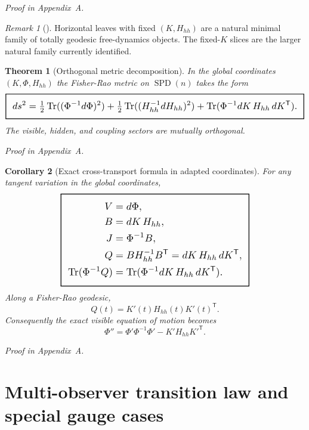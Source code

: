 \documentclass[11pt,a4paper]{article}
\numberwithin{equation}{section}
\DeclareMathOperator{\Tr}{Tr}
\DeclareMathOperator{\SPD}{SPD}
\newcommand{\geomboxed}[1]{%
  \setlength{\fboxsep}{8pt}%
  \setlength{\fboxrule}{0.9pt}%
  \fbox{\scalebox{1.22}{$\displaystyle #1$}}%
}
\theoremstyle{thmcompact}
\newtheorem{theorem}{Theorem}[section]
\newtheorem{corollary}[theorem]{Corollary}
\theoremstyle{remark}
\newtheorem*{remarkplain}{Remark}
\newenvironment{remark}[1][]%
{\begin{remarkbox}\begin{remarkplain}[#1]\normalfont}
{\end{remarkplain}\end{remarkbox}}
\newcommand{\proofappendix}{\par{\hfill\scriptsize\emph{Proof in Appendix~A.}}\par}
\begin{document}
\proofappendix

\begin{remark}
Horizontal leaves with fixed $(K,H_{hh})$ are a natural minimal family of totally geodesic free-dynamics objects. The fixed-$K$ slices are the larger natural family currently identified.
\end{remark}

\begin{theorem}[Orthogonal metric decomposition]
\label{thm:metric-decomposition}
In the global coordinates $(K,\Phi,H_{hh})$ the Fisher-Rao metric on $\SPD(n)$ takes the form
\begin{equation}
\geomboxed{ds^2=\tfrac12\Tr((\Phi^{-1}d\Phi)^2)+\tfrac12\Tr((H_{hh}^{-1}dH_{hh})^2)+\Tr(\Phi^{-1}dK\,H_{hh}\,dK^{\mathsf T}).}
\label{eq:metric-decomposition}
\end{equation}
The visible, hidden, and coupling sectors are mutually orthogonal.
\end{theorem}

\proofappendix

\begin{corollary}[Exact cross-transport formula in adapted coordinates]
\label{cor:Q-K-formula}
For any tangent variation in the global coordinates,
\begin{equation}
\geomboxed{
\begin{aligned}
V&=d\Phi,\\
B&=dK\,H_{hh},\\
J&=\Phi^{-1}B,\\
Q&=BH_{hh}^{-1}B^{\mathsf T}=dK\,H_{hh}\,dK^{\mathsf T},\\
\Tr(\Phi^{-1}Q)&=\Tr(\Phi^{-1}dK\,H_{hh}\,dK^{\mathsf T}).
\end{aligned}
}
\label{eq:Q-K-formula}
\end{equation}
Along a Fisher-Rao geodesic,
\begin{equation}
Q(t)=K'(t)H_{hh}(t)K'(t)^{\mathsf T}.
\label{eq:Q-time-K}
\end{equation}
Consequently the exact visible equation of motion becomes
\begin{equation}
\boxed{\Phi''=\Phi'\Phi^{-1}\Phi' - K'H_{hh}K'^{\mathsf T}.}
\label{eq:adapted-eom}
\end{equation}
\end{corollary}

\proofappendix

\section{Multi-observer transition law and special gauge cases}
\end{document}
